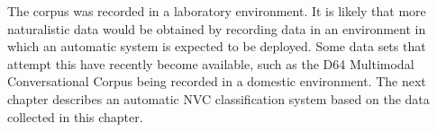 The corpus was recorded in a laboratory environment. It is likely that more naturalistic data would be obtained by recording data in an environment in which an automatic system is expected to be deployed. Some data sets that attempt this have recently become available, such as the D64 Multimodal Conversational Corpus being recorded in a domestic environment. %
The next chapter describes an automatic \ac{NVC} classification system based on the data collected in this chapter.

